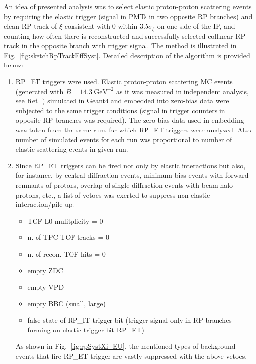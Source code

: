 An idea of presented analysis was to select elastic proton-proton scattering events by requiring the elastic trigger (signal in PMTs in two opposite RP branches) and clean RP track of $\xi$ consistent with 0 within $3.5\sigma_{\xi}$ on one side of the IP, and counting how often there is reconstructed and successfully selected collinear RP track in the opposite branch with trigger signal. The method is illustrated in Fig.~\ref{fig:sketchRpTrackEffSyst}. Detailed description of the algorithm is provided below:
\begin{enumerate}
\item RP\_ET triggers were used. Elastic proton-proton scattering MC events (generated with $B=14.3~\text{GeV}^{-2}$ as it was measured in independent analysis, see Ref.~\cite{ElasticNote}) simulated in Geant4 and embedded into zero-bias data were subjected to the same trigger conditions (signal in trigger counters in opposite RP branches was required). The zero-bias data used in embedding was taken from the same runs for which RP\_ET triggers were analyzed. Also number of simulated events for each run was proportional to number of elastic scattering events in given run.\vspace{-4pt}
\item Since RP\_ET triggers can be fired not only by elastic interactions but also, for instance, by central diffraction events, minimum bias events with forward remnants of protons, overlap of single diffraction events with beam halo protons, etc., a list of vetoes was exerted to suppress non-elastic interaction/pile-up:\vspace*{-7pt}
\begin{multicols}{3}
	\begin{itemize}
		\item TOF L0 mulitplicity = 0
		\item n. of TPC-TOF tracks = 0
		\item n. of recon. TOF hits = 0
		\item empty ZDC
		\item empty VPD
		\item empty BBC (small, large)
		\item false state of RP\_IT trigger bit (trigger signal only in RP branches forming an elastic trigger bit RP\_ET)
	\end{itemize}
\end{multicols}\vspace{-10pt}
As shown in Fig.~\ref{fig:rpSystXi_EU}, the mentioned types of background events that fire RP\_ET trigger are vastly suppressed with the above vetoes.\vspace{-4pt}

\end{enumerate}
